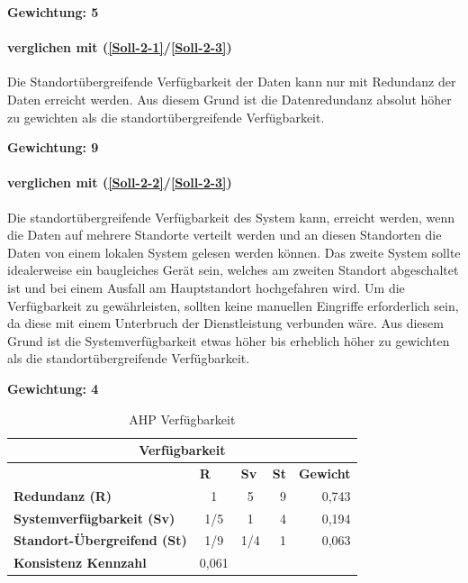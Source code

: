 \textbf{Gewichtung: 5}

\paragraph*{ verglichen mit  (\ref{Soll-2-1}/\ref{Soll-2-3})}
Die Standortübergreifende Verfügbarkeit der Daten kann nur mit Redundanz der Daten erreicht werden. Aus diesem Grund ist die Datenredundanz absolut höher zu gewichten als die standortübergreifende Verfügbarkeit.

\textbf{Gewichtung: 9}

\paragraph*{ verglichen mit  (\ref{Soll-2-2}/\ref{Soll-2-3})}
Die standortübergreifende Verfügbarkeit des System kann, erreicht werden, wenn die Daten auf mehrere Standorte verteilt werden und an diesen Standorten die Daten von einem lokalen System gelesen werden können. Das zweite System sollte idealerweise ein baugleiches Gerät sein, welches am zweiten Standort abgeschaltet ist und bei einem Ausfall am Hauptstandort hochgefahren wird.
Um die Verfügbarkeit zu gewährleisten, sollten keine manuellen Eingriffe erforderlich sein, da diese mit einem Unterbruch der Dienstleistung verbunden wäre. Aus diesem Grund ist die Systemverfügbarkeit etwas höher bis erheblich höher zu gewichten als die standortübergreifende Verfügbarkeit.

\textbf{Gewichtung: 4}

\begin{table}[htbp]
\caption{AHP Verfügbarkeit}
\begin{tabular}{|l|c|c|c|l|}
\hline
\multicolumn{ 5}{|c|}{\textbf{Verfügbarkeit}} \\ \hline
 & \multicolumn{1}{l|}{\textbf{R}} & \multicolumn{1}{l|}{\textbf{Sv}} & \textbf{St} & \textbf{Gewicht} \\ \hline
\textbf{Redundanz (R)} & 1 & 5 & \multicolumn{1}{r|}{9} & \multicolumn{1}{r|}{0,743} \\ \hline
\textbf{Systemverfügbarkeit (Sv)} & 1/5 & 1 & \multicolumn{1}{r|}{4} & \multicolumn{1}{r|}{0,194} \\ \hline
\textbf{Standort-Übergreifend (St)} & 1/9 & 1/4 & \multicolumn{1}{r|}{1} & \multicolumn{1}{r|}{0,063} \\ \hline
\textbf{Konsistenz Kennzahl} & 0,061 \\ \cline{1-2}
\end{tabular}
\label{tab:AHPVerfügbarkeit}
\end{table}

